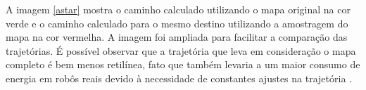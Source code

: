 \documentclass[eq,capa]{texufpel}
\begin{document}


 
A imagem \ref{astar} mostra o caminho calculado utilizando o mapa original na cor verde e o caminho calculado para o mesmo destino utilizando a amostragem do mapa na cor vermelha. A imagem foi ampliada para facilitar a comparação das trajetórias. É possível observar que a trajetória que leva em consideração o mapa completo é bem menos retilínea, fato que também levaria a um maior consumo de energia em robôs reais devido à necessidade de constantes ajustes na trajetória \cite{raj2022comprehensive}.
\end{document}
